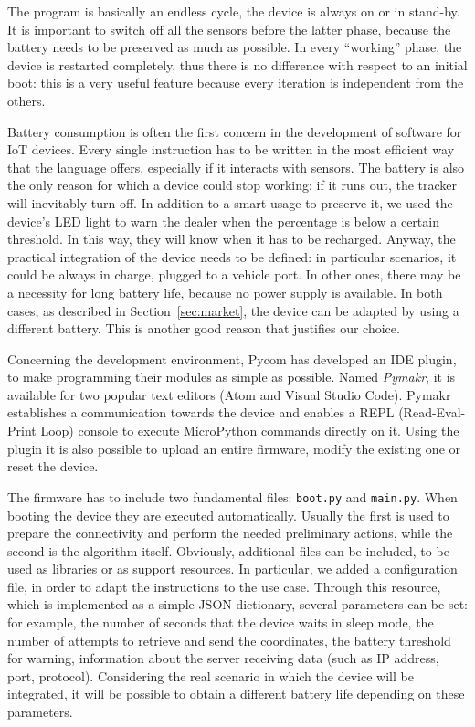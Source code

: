 The program is basically an endless cycle, the device is always on or in stand-by. It is important to switch off all the sensors before the latter phase, because the battery needs to be preserved as much as possible. In every ``working'' phase, the device is restarted completely, thus there is no difference with respect to an initial boot: this is a very useful feature because every iteration is independent from the others.

Battery consumption is often the first concern in the development of software for IoT devices. Every single instruction has to be written in the most efficient way that the language offers, especially if it interacts with sensors. The battery is also the only reason for which a device could stop working: if it runs out, the tracker will inevitably turn off. In addition to a smart usage to preserve it, we used the device's LED light to warn the dealer when the percentage is below a certain threshold. In this way, they will know when it has to be recharged. Anyway, the practical integration of the device needs to be defined: in particular scenarios, it could be always in charge, plugged to a vehicle port. In other ones, there may be a necessity for long battery life, because no power supply is available. In both cases, as described in Section~\ref{sec:market}, the device can be adapted by using a different battery. This is another good reason that justifies our choice.

Concerning the development environment, Pycom has developed an IDE plugin, to make programming their modules as simple as possible. Named \emph{Pymakr}, it is available for two popular text editors (Atom and Visual Studio Code). Pymakr establishes a communication towards the device and enables a REPL (Read-Eval-Print Loop) console to execute MicroPython commands directly on it. Using the plugin it is also possible to upload an entire firmware, modify the existing one or reset the device.

The firmware has to include two fundamental files: \texttt{boot.py} and \texttt{main.py}. When booting the device they are executed automatically. Usually the first is used to prepare the connectivity and perform the needed preliminary actions, while the second is the algorithm itself. Obviously, additional files can be included, to be used as libraries or as support resources. In particular, we added a configuration file, in order to adapt the instructions to the use case. Through this resource, which is implemented as a simple JSON dictionary, several parameters can be set: for example, the number of seconds that the device waits in sleep mode, the number of attempts to retrieve and send the coordinates, the battery threshold for warning, information about the server receiving data (such as IP address, port, protocol). Considering the real scenario in which the device will be integrated, it will be possible to obtain a different battery life depending on these parameters.

